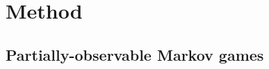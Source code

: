 \documentclass{article} %
\begin{document}

\vspace{-5pt}
\section{Method}
\vspace{-5pt}

\subsection{Partially-observable Markov games}
\end{document}
